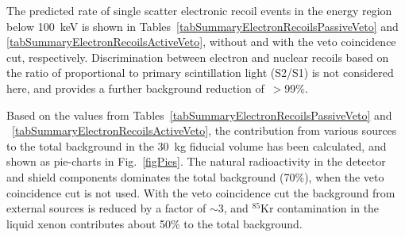 The predicted rate of single scatter electronic recoil events in the energy region below 100~keV is shown in Tables~\ref{tabSummaryElectronRecoilsPassiveVeto} and \ref{tabSummaryElectronRecoilsActiveVeto}, without and with the veto coincidence cut, respectively. Discrimination between electron and nuclear recoils based on the ratio of proportional to primary scintillation light (S2/S1) is not considered here, and provides a further background reduction of~$>$99\%.


Based on the values from Tables~\ref{tabSummaryElectronRecoilsPassiveVeto} and ~\ref{tabSummaryElectronRecoilsActiveVeto}, the contribution from various sources to the total background in the 30~kg fiducial volume has been calculated, and shown as pie-charts in Fig.~\ref{figPies}. The natural radioactivity in the detector and shield components dominates the total background (70\%), when the veto coincidence cut is not used. With the veto coincidence cut the background from external sources is reduced by a factor of $\sim$3, and $^{85}$Kr contamination in the liquid xenon contributes about 50\% to the total background.


